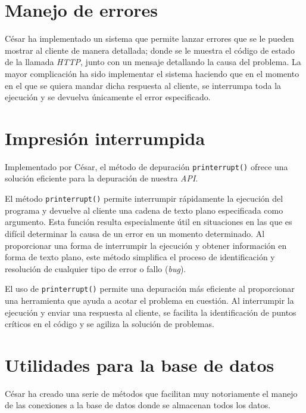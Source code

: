 \documentclass[12pt]{report}
\begin{document}
\section{Manejo de errores}
César ha implementado un sistema que permite lanzar errores que se le pueden mostrar al cliente de manera detallada; donde se le muestra el código de estado de la llamada \textit{HTTP}, junto con un mensaje detallando la causa del problema. La mayor complicación ha sido implementar el sistema haciendo que en el momento en el que se quiera mandar dicha respuesta al cliente, se interrumpa toda la ejecución y se devuelva únicamente el error especificado.

\section{Impresión interrumpida}
Implementado por César, el método de depuración \texttt{printerrupt()} ofrece una solución eficiente para la depuración de nuestra \textit{API}.

El método \texttt{printerrupt()} permite interrumpir rápidamente la ejecución del programa y devuelve al cliente una cadena de texto plano especificada como argumento. Esta función resulta especialmente útil en situaciones en las que es difícil determinar la causa de un error en un momento determinado. Al proporcionar una forma de interrumpir la ejecución y obtener información en forma de texto plano, este método simplifica el proceso de identificación y resolución de cualquier tipo de error o fallo (\emph{bug}).

El uso de \texttt{printerrupt()} permite una depuración más eficiente al proporcionar una herramienta que ayuda a acotar el problema en cuestión. Al interrumpir la ejecución y enviar una respuesta al cliente, se facilita la identificación de puntos críticos en el código y se agiliza la solución de problemas.
\section{Utilidades para la base de datos}
César ha creado una serie de métodos que facilitan muy notoriamente el manejo de las conexiones a la base de datos donde se almacenan todos los datos.
\end{document}
